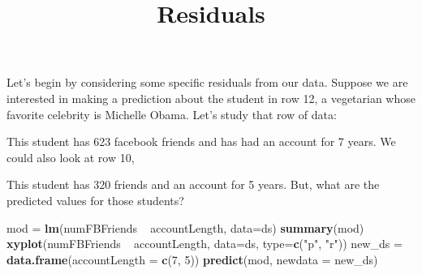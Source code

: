 \documentclass[]{article}
\title{Residuals}
\author{}
\date{}
\newenvironment{Shaded}{\begin{snugshade}}{\end{snugshade}}
\newcommand{\KeywordTok}[1]{\textcolor[rgb]{0.13,0.29,0.53}{\textbf{{#1}}}}
\newcommand{\DataTypeTok}[1]{\textcolor[rgb]{0.13,0.29,0.53}{{#1}}}
\newcommand{\DecValTok}[1]{\textcolor[rgb]{0.00,0.00,0.81}{{#1}}}
\newcommand{\StringTok}[1]{\textcolor[rgb]{0.31,0.60,0.02}{{#1}}}
\newcommand{\CommentTok}[1]{\textcolor[rgb]{0.56,0.35,0.01}{\textit{{#1}}}}
\newcommand{\NormalTok}[1]{{#1}}
\begin{document}
\maketitle

Let's begin by considering some specific residuals from our data.
Suppose we are interested in making a prediction about the student in
row 12, a vegetarian whose favorite celebrity is Michelle Obama. Let's
study that row of data:

\begin{Shaded}
\end{Shaded}

This student has 623 facebook friends and has had an account for 7
years. We could also look at row 10,

\begin{Shaded}
\end{Shaded}

This student has 320 friends and an account for 5 years. But, what are
the predicted values for those students?

\begin{Shaded}
\begin{Highlighting}[]
\NormalTok{mod =}\StringTok{ }\KeywordTok{lm}\NormalTok{(numFBFriends ~}\StringTok{ }\NormalTok{accountLength, }\DataTypeTok{data=}\NormalTok{ds)}
\KeywordTok{summary}\NormalTok{(mod)}
\KeywordTok{xyplot}\NormalTok{(numFBFriends ~}\StringTok{ }\NormalTok{accountLength, }\DataTypeTok{data=}\NormalTok{ds, }\DataTypeTok{type=}\KeywordTok{c}\NormalTok{(}\StringTok{"p"}\NormalTok{, }\StringTok{"r"}\NormalTok{))}
\NormalTok{new_ds =}\StringTok{ }\KeywordTok{data.frame}\NormalTok{(}\DataTypeTok{accountLength =} \KeywordTok{c}\NormalTok{(}\DecValTok{7}\NormalTok{, }\DecValTok{5}\NormalTok{))}
\KeywordTok{predict}\NormalTok{(mod, }\DataTypeTok{newdata =} \NormalTok{new_ds)}
\end{Highlighting}
\end{Shaded}
\end{document}
